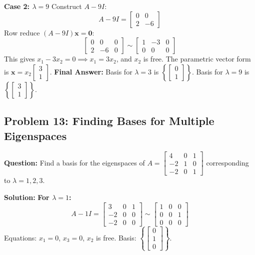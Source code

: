 \documentclass[11pt, a4paper]{article}
\theoremstyle{definition}
\theoremstyle{remark}
\begin{document}
\textbf{Case 2: $\lambda = 9$}
Construct $A - 9I$:
\[
A - 9I = \begin{bmatrix} 0 & 0 \\ 2 & -6 \end{bmatrix}
\]
Row reduce $(A - 9I)\mathbf{x} = \mathbf{0}$:
\[
\begin{bmatrix} 0 & 0 & 0 \\ 2 & -6 & 0 \end{bmatrix} \sim \begin{bmatrix} 1 & -3 & 0 \\ 0 & 0 & 0 \end{bmatrix}
\]
This gives $x_1 - 3x_2 = 0 \implies x_1 = 3x_2$, and $x_2$ is free. The parametric vector form is $\mathbf{x} = x_2 \begin{bmatrix} 3 \\ 1 \end{bmatrix}$.
\textbf{Final Answer:} Basis for $\lambda = 3$ is $\left\{ \begin{bmatrix} 0 \\ 1 \end{bmatrix} \right\}$. Basis for $\lambda = 9$ is $\left\{ \begin{bmatrix} 3 \\ 1 \end{bmatrix} \right\}$.

\subsection{Problem 13: Finding Bases for Multiple Eigenspaces}
\textbf{Question:} Find a basis for the eigenspaces of $A = \begin{bmatrix} 4 & 0 & 1 \\ -2 & 1 & 0 \\ -2 & 0 & 1 \end{bmatrix}$ corresponding to $\lambda = 1, 2, 3$.

\textbf{Solution:}
\textbf{For $\lambda = 1$:}
\[
A - 1I = \begin{bmatrix} 3 & 0 & 1 \\ -2 & 0 & 0 \\ -2 & 0 & 0 \end{bmatrix} \sim \begin{bmatrix} 1 & 0 & 0 \\ 0 & 0 & 1 \\ 0 & 0 & 0 \end{bmatrix}
\]
Equations: $x_1 = 0$, $x_3 = 0$, $x_2$ is free. Basis: $\left\{ \begin{bmatrix} 0 \\ 1 \\ 0 \end{bmatrix} \right\}$.
\end{document}

